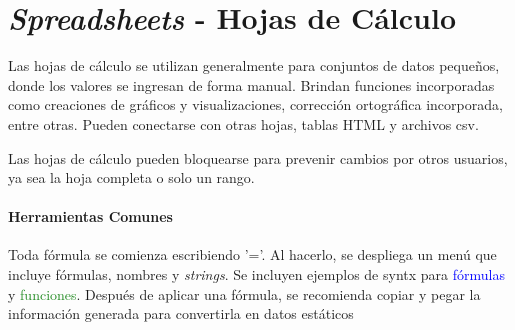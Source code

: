 
\section{\textit{Spreadsheets} - Hojas de Cálculo}
Las hojas de cálculo se utilizan generalmente para conjuntos de datos pequeños, donde los valores se ingresan de forma manual. Brindan funciones incorporadas como creaciones de gráficos y visualizaciones, corrección ortográfica incorporada, entre otras. Pueden conectarse con otras hojas, tablas HTML y archivos \gls{csv}.

Las hojas de cálculo pueden bloquearse para prevenir cambios por otros usuarios, ya sea la hoja completa o solo un rango. 

\paragraph{Herramientas Comunes}
Toda fórmula se comienza escribiendo '='. Al hacerlo, se despliega un menú que incluye fórmulas, nombres y \textit{strings}. Se incluyen ejemplos de \gls{syntx} para \textcolor{blue}{fórmulas} y \textcolor{ForestGreen}{funciones}. Después de aplicar una fórmula, se recomienda copiar y pegar la información generada para convertirla en datos estáticos
